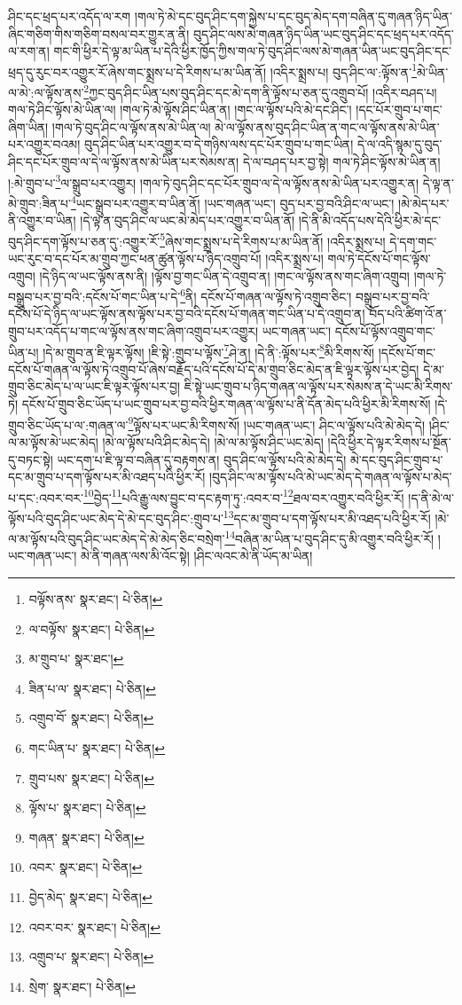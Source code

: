 ཤིང་དང་ཕྲད་པར་འདོད་ལ་རག །གལ་ཏེ་མེ་དང་བུད་ཤིང་དག་སྐྱེས་པ་དང་བུད་མེད་དག་བཞིན་དུ་གཞན་ཉིད་ཡིན་ཞིང་གཅིག་གིས་གཅིག་བསལ་བར་གྱུར་ན་ནི། བུད་ཤིང་ལས་མེ་གཞན་ཉིད་ཡིན་ཡང་བུད་ཤིང་དང་ཕྲད་པར་འདོད་ལ་རག་ན། གང་གི་ཕྱིར་དེ་ལྟ་མ་ཡིན་པ་དེའི་ཕྱིར་ཁྱོད་ཀྱིས་གལ་ཏེ་བུད་ཤིང་ལས་མེ་གཞན་ཡིན་ཡང་བུད་ཤིང་དང་ཕྲད་དུ་རུང་བར་འགྱུར་རོ་ཞེས་གང་སྨྲས་པ་དེ་རིགས་པ་མ་ཡིན་ནོ། །འདིར་སྨྲས་པ། བུད་ཤིང་ལ་:ལྟོས་ན་\footnote{བལྟོས་ནས་  སྣར་ཐང་།  པེ་ཅིན། }མེ་ཡིན་ལ་མེ་:ལ་ལྟོས་ནས་\footnote{ལ་བལྟོས་  སྣར་ཐང་།  པེ་ཅིན། }ཀྱང་བུད་ཤིང་ཡིན་པས་བུད་ཤིང་དང་མེ་དག་ནི་ལྟོས་པ་ཅན་དུ་འགྲུབ་པོ། །འདིར་བཤད་པ། གལ་ཏེ་ཤིང་ལྟོས་མེ་ཡིན་ལ། །གལ་ཏེ་མེ་ལྟོས་ཤིང་ཡིན་ན། །གང་ལ་ལྟོས་པའི་མེ་དང་ཤིང་། །དང་པོར་གྲུབ་པ་གང་ཞིག་ཡིན། །གལ་ཏེ་བུད་ཤིང་ལ་ལྟོས་ནས་མེ་ཡིན་ལ། མེ་ལ་ལྟོས་ནས་བུད་ཤིང་ཡིན་ན་གང་ལ་ལྟོས་ནས་མེ་ཡིན་པར་འགྱུར་བའམ། བུད་ཤིང་ཡིན་པར་འགྱུར་བ་དེ་གཉིས་ལས་དང་པོར་གྲུབ་པ་གང་ཡིན། དེ་ལ་འདི་སྙམ་དུ་བུད་ཤིང་དང་པོར་གྲུབ་ལ་དེ་ལ་ལྟོས་ནས་མེ་ཡིན་པར་སེམས་ན། དེ་ལ་བཤད་པར་བྱ་སྟེ། གལ་ཏེ་ཤིང་ལྟོས་མེ་ཡིན་ན། །:མེ་གྲུབ་པ་\footnote{མ་གྲུབ་པ་  སྣར་ཐང་། }ལ་སྒྲུབ་པར་འགྱུར། །གལ་ཏེ་བུད་ཤིང་དང་པོར་གྲུབ་ལ་དེ་ལ་ལྟོས་ནས་མེ་ཡིན་པར་འགྱུར་ན། དེ་ལྟ་ན་མེ་གྲུབ་:ཟིན་པ་\footnote{ཟིན་པ་ལ་  སྣར་ཐང་།  པེ་ཅིན། }ཡང་སྒྲུབ་པར་འགྱུར་བ་ཡིན་ནོ། །ཡང་གཞན་ཡང་། བུད་པར་བྱ་བའི་ཤིང་ལ་ཡང་། །མེ་མེད་པར་ནི་འགྱུར་བ་ཡིན། །དེ་ལྟ་ན་བུད་ཤིང་ལ་ཡང་མེ་མེད་པར་འགྱུར་བ་ཡིན་ནོ། །དེ་ནི་མི་འདོད་པས་དེའི་ཕྱིར་མེ་དང་བུད་ཤིང་དག་ལྟོས་པ་ཅན་དུ་:འགྱུར་རོ་\footnote{འགྲུབ་བོ་  སྣར་ཐང་།  པེ་ཅིན། }ཞེས་གང་སྨྲས་པ་དེ་རིགས་པ་མ་ཡིན་ནོ། །འདིར་སྨྲས་པ། དེ་དག་གང་ཡང་རུང་བ་དང་པོར་མ་གྲུབ་ཀྱང་ཕན་ཚུན་ལྟོས་པ་ཉིད་འགྲུབ་པོ། །འདིར་སྨྲས་པ། གལ་ཏེ་དངོས་པོ་གང་ལྟོས་འགྲུབ། །དེ་ཉིད་ལ་ཡང་ལྟོས་ནས་ནི། །ལྟོས་བྱ་གང་ཡིན་དེ་འགྲུབ་ན། །གང་ལ་ལྟོས་ནས་གང་ཞིག་འགྲུབ། །གལ་ཏེ་བསྒྲུབ་པར་བྱ་བའི་:དངོས་པོ་གང་ཡིན་པ་དེ་\footnote{གང་ཡིན་པ་  སྣར་ཐང་།  པེ་ཅིན། }ནི། དངོས་པོ་གཞན་ལ་ལྟོས་ཏེ་འགྲུབ་ཅིང་། བསྒྲུབ་པར་བྱ་བའི་དངོས་པོ་དེ་ཉིད་ལ་ཡང་ལྟོས་ནས་ལྟོས་པར་བྱ་བའི་དངོས་པོ་གཞན་གང་ཡིན་པ་དེ་འགྲུབ་ན། བོད་པའི་ཚིག་འོ་ན་གྲུབ་པར་འདོད་པ་གང་ལ་ལྟོས་ནས་གང་ཞིག་འགྲུབ་པར་འགྱུར། ཡང་གཞན་ཡང་། དངོས་པོ་ལྟོས་འགྲུབ་གང་ཡིན་པ། །དེ་མ་གྲུབ་ན་ཇི་ལྟར་ལྟོས། །ཇི་སྟེ་:གྲུབ་པ་ལྟོས་\footnote{གྲུབ་པས་  སྣར་ཐང་།  པེ་ཅིན། }ཤེ་ན། །དེ་ནི་:ལྟོས་པར་\footnote{ལྟོས་པ་  སྣར་ཐང་།  པེ་ཅིན། }མི་རིགས་སོ། །དངོས་པོ་གང་དངོས་པོ་གཞན་ལ་ལྟོས་ཏེ་འགྲུབ་པོ་ཞེས་བརྗོད་པའི་དངོས་པོ་དེ་མ་གྲུབ་ཅིང་མེད་ན་ཇི་ལྟར་ལྟོས་པར་བྱེད། དེ་མ་གྲུབ་ཅིང་མེད་པ་ལ་ཡང་ཇི་ལྟར་ལྟོས་པར་བྱ། ཇི་སྟེ་ཡང་གྲུབ་པ་ཉིད་གཞན་ལ་ལྟོས་པར་སེམས་ན་དེ་ཡང་མི་རིགས་ཏེ། དངོས་པོ་གྲུབ་ཅིང་ཡོད་པ་ཡང་གྲུབ་པར་བྱ་བའི་ཕྱིར་གཞན་ལ་ལྟོས་པ་ནི་དོན་མེད་པའི་ཕྱིར་མི་རིགས་སོ། །དེ་གྲུབ་ཅིང་ཡོད་པ་ལ་:གཞན་ལ་\footnote{གཞན་  སྣར་ཐང་།  པེ་ཅིན། }ལྟོས་པར་ཡང་མི་རིགས་སོ། །ཡང་གཞན་ཡང་། ཤིང་ལ་ལྟོས་པའི་མེ་མེད་དེ། །ཤིང་ལ་མ་ལྟོས་མེ་ཡང་མེད། །མེ་ལ་ལྟོས་པའི་ཤིང་མེད་དེ། །མེ་ལ་མ་ལྟོས་ཤིང་ཡང་མེད། །དེའི་ཕྱིར་དེ་ལྟར་རིགས་པ་སྔོན་དུ་བཏང་སྟེ། ཡང་དག་པ་ཇི་ལྟ་བ་བཞིན་དུ་བརྟགས་ན། བུད་ཤིང་ལ་ལྟོས་པའི་མེ་མེད་དེ། མེ་དང་བུད་ཤིང་གྲུབ་པ་དང་མ་གྲུབ་པ་དག་ལྟོས་པར་མི་འཐད་པའི་ཕྱིར་རོ། །བུད་ཤིང་ལ་མ་ལྟོས་པའི་མེ་ཡང་མེད་དེ་གཞན་ལ་ལྟོས་པ་མེད་པ་དང་:འབར་བར་\footnote{འབར་  སྣར་ཐང་།  པེ་ཅིན། }བྱེད་\footnote{བྱེད་མེད་  སྣར་ཐང་།  པེ་ཅིན། }པའི་རྒྱུ་ལས་བྱུང་བ་དང་རྟག་ཏུ་:འབར་བ་\footnote{འབར་བར་  སྣར་ཐང་།  པེ་ཅིན། }ཐལ་བར་འགྱུར་བའི་ཕྱིར་རོ། །ད་ནི་མེ་ལ་ལྟོས་པའི་བུད་ཤིང་ཡང་མེད་དེ་མེ་དང་བུད་ཤིང་:གྲུབ་པ་\footnote{འགྲུབ་པ་  སྣར་ཐང་།  པེ་ཅིན། }དང་མ་གྲུབ་པ་དག་ལྟོས་པར་མི་འཐད་པའི་ཕྱིར་རོ། །མེ་ལ་མ་ལྟོས་པའི་བུད་ཤིང་ཡང་མེད་དེ་མེ་མེད་ཅིང་བསྲེག་\footnote{སྲེག་  སྣར་ཐང་།  པེ་ཅིན། }བཞིན་མ་ཡིན་པ་བུད་ཤིང་དུ་མི་འགྱུར་བའི་ཕྱིར་རོ། །ཡང་གཞན་ཡང་། མེ་ནི་གཞན་ལས་མི་འོང་སྟེ། །ཤིང་ལའང་མེ་ནི་ཡོད་མ་ཡིན། 